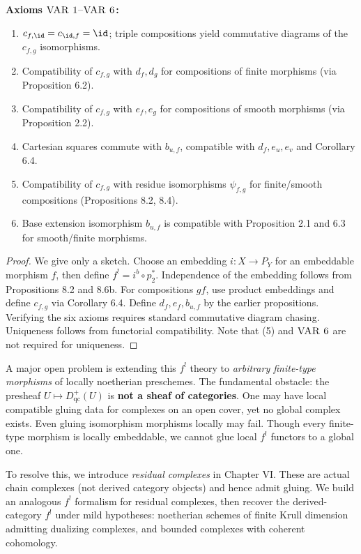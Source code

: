 \noindent\textbf{Axioms \(\textsc{VAR 1--VAR 6}\):}
\begin{enumerate}
\item[\(\textsc{VAR 1}\)] \(c_{f,\id}=c_{\id,f}=\id\); triple compositions yield commutative diagrams of the \(c_{f,g}\) isomorphisms.

\item[\(\textsc{VAR 2}\)] Compatibility of \(c_{f,g}\) with \(d_f,d_g\) for compositions of finite morphisms (via Proposition 6.2).

\item[\(\textsc{VAR 3}\)] Compatibility of \(c_{f,g}\) with \(e_f,e_g\) for compositions of smooth morphisms (via Proposition 2.2).

\item[\(\textsc{VAR 4}\)] Cartesian squares commute with \(b_{u,f}\), compatible with \(d_f,e_u,e_v\) and Corollary 6.4.

\item[\(\textsc{VAR 5}\)] Compatibility of \(c_{f,g}\) with residue isomorphisms \(\psi_{f,g}\) for finite/smooth compositions (Propositions 8.2, 8.4).

\item[\(\textsc{VAR 6}\)] Base extension isomorphism \(b_{u,f}\) is compatible with Proposition 2.1 and 6.3 for smooth/finite morphisms.
\end{enumerate}

\setcounter{page}{192}
\begin{proof}
We give only a sketch. Choose an embedding \(i\colon X\to P_Y\) for an embeddable morphism \(f\), then define \(f^! = i^b\circ p_2^*\). Independence of the embedding follows from Propositions 8.2 and 8.6b. For compositions \(gf\), use product embeddings and define \(c_{f,g}\) via Corollary 6.4. Define \(d_f,e_f,b_{u,f}\) by the earlier propositions. Verifying the six axioms requires standard commutative diagram chasing. Uniqueness follows from functorial compatibility. Note that (5) and \(\textsc{VAR 6}\) are not required for uniqueness.
\end{proof}

\setcounter{page}{193}
\begin{remark}
A major open problem is extending this \(f^!\) theory to \textit{arbitrary finite-type morphisms} of locally noetherian preschemes. The fundamental obstacle: the presheaf \(U\mapsto D_{\mathrm{qc}}^+(U)\) is \textbf{not a sheaf of categories}. One may have local compatible gluing data for complexes on an open cover, yet no global complex exists. Even gluing isomorphism morphisms locally may fail. Though every finite-type morphism is locally embeddable, we cannot glue local \(f^!\) functors to a global one.

To resolve this, we introduce \textit{residual complexes} in Chapter VI. These are actual chain complexes (not derived category objects) and hence admit gluing. We build an analogous \(f^!\) formalism for residual complexes, then recover the derived-category \(f^!\) under mild hypotheses: noetherian schemes of finite Krull dimension admitting dualizing complexes, and bounded complexes with coherent cohomology.
\end{remark}

